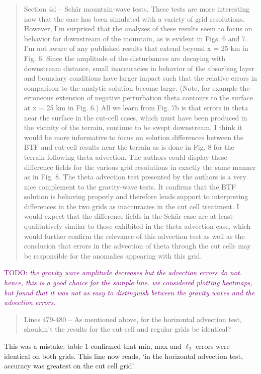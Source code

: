 \documentclass{article}
\newcommand{\TODO}[1]{\textcolor{purple}{TODO: \emph{#1}}}
\begin{document}
\begin{quotation}
	Section 4d – Sch\"{a}r mountain-wave tests. These tests are more interesting now that 
 the case has been simulated with a variety of grid resolutions. However, I'm 
 surprised that the analyses of these results seem to focus on behavior far 
 downstream of the mountain, as is evident in Figs. 6 and 7. I'm not aware of any 
 published results that extend beyond x = 25 km in Fig. 6. Since the amplitude of the 
 disturbances are decaying with downstream distance, small inaccuracies in behavior 
 of the absorbing layer and boundary conditions have larger impact such that the 
 relative errors in comparison to the analytic solution become large. (Note, for 
 example the erroneous extension of negative perturbation theta contours to the 
 surface at x = 25 km in Fig. 6.)  All we learn from Fig. 7b is that errors in theta near 
 the surface in the cut-cell cases, which must have been produced in the vicinity of the 
 terrain, continue to be swept downstream. I think it would be more informative to 
 focus on solution differences between the BTF and cut-cell results near the terrain as 
 is done in Fig. 8 for the terrain-following theta advection. The authors could display 
 these difference fields for the various grid resolutions in exactly the same manner as 
 in Fig. 8. The theta advection test presented by the authors is a very nice complement 
 to the gravity-wave tests. It confirms that the BTF solution is behaving properly and 
 therefore lends support to interpreting differences in the two grids as inaccuracies in 
 the cut cell treatment. I would expect that the difference fields in the Sch\"{a}r case are 
 at least qualitatively similar to those exhibited in the theta advection case, which 
 would further confirm the relevance of this advection test as well as the conclusion 
 that errors in the advection of theta through the cut cells may be responsible for the 
 anomalies appearing with this grid.
\end{quotation}
\TODO{the gravity wave amplitude decreases but the advection errors do not.  hence, this is a good choice for the sample line.  we considered plotting heatmaps, but found that it was not as easy to distinguish between the gravity waves and the advection errors.}

\begin{quotation}
 Lines 479-480 – As mentioned above, for the horizontal advection test, shouldn't the  results for the cut-cell and regular grids be identical?
\end{quotation}
This was a mistake: table 1 confirmed that min, max and $\ell_2$ errors were identical on both grids.  This line now reads, `in the horizontal advection test, accuracy was greatest on the cut cell grid'.
\end{document}
